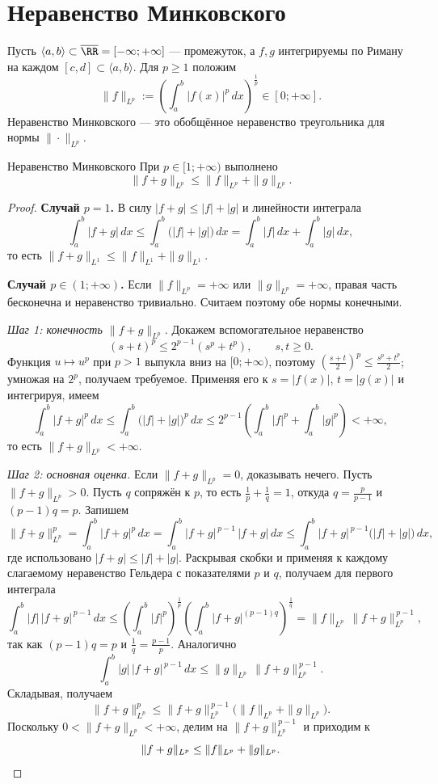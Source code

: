 
\section{Неравенство Минковского}

Пусть $\langle a,b\rangle\subset\overline{\RR}=[-\infty;+\infty]$ --- промежуток,
а $f,g$ интегрируемы по Риману на каждом $[c,d]\subset\langle a,b\rangle$. Для
$p\ge1$ положим
\[
\|f\|_{L^p}:=\left(\int_a^b |f(x)|^p\,dx\right)^{\frac1p}\in[0;+\infty].
\]
Неравенство Минковского --- это обобщённое неравенство треугольника для нормы
$\|\cdot\|_{L^p}$.

\begin{Theorem}{Неравенство Минковского}{}
	При $p\in[1;+\infty)$ выполнено
	\[
	\|f+g\|_{L^p}\le \|f\|_{L^p}+\|g\|_{L^p}.
	\]
\end{Theorem}

\begin{proof}
	\textbf{Случай $p=1$.} В силу $|f+g|\le|f|+|g|$ и линейности интеграла
	\[
	\int_a^b|f+g|\,dx\le\int_a^b\bigl(|f|+|g|\bigr)\,dx=\int_a^b|f|\,dx+\int_a^b|g|\,dx,
	\]
	то есть $\|f+g\|_{L^1}\le\|f\|_{L^1}+\|g\|_{L^1}$.

	\medskip
	\textbf{Случай $p\in(1;+\infty)$.} Если $\|f\|_{L^p}=+\infty$ или
	$\|g\|_{L^p}=+\infty$, правая часть бесконечна и неравенство тривиально.
	Считаем поэтому обе нормы конечными.

	\emph{Шаг 1: конечность $\|f+g\|_{L^p}$.} Докажем вспомогательное неравенство
	\[
	(s+t)^p\le 2^{p-1}(s^p+t^p),\qquad s,t\ge0.
	\]
	Функция $u\mapsto u^p$ при $p>1$ выпукла вниз на $[0;+\infty)$, поэтому
	$\left(\frac{s+t}{2}\right)^p\le\frac{s^p+t^p}{2}$; умножая на $2^p$, получаем
	требуемое. Применяя его к $s=|f(x)|$, $t=|g(x)|$ и интегрируя, имеем
	\[
	\int_a^b|f+g|^p\,dx\le\int_a^b\bigl(|f|+|g|\bigr)^p\,dx
	\le 2^{p-1}\left(\int_a^b|f|^p+\int_a^b|g|^p\right)<+\infty,
	\]
	то есть $\|f+g\|_{L^p}<+\infty$.

	\emph{Шаг 2: основная оценка.} Если $\|f+g\|_{L^p}=0$, доказывать нечего.
	Пусть $\|f+g\|_{L^p}>0$. Пусть $q$ сопряжён к $p$, то есть
	$\frac1p+\frac1q=1$, откуда $q=\frac{p}{p-1}$ и $(p-1)q=p$. Запишем
	\[
	\|f+g\|_{L^p}^p=\int_a^b|f+g|^p\,dx=\int_a^b|f+g|^{\,p-1}\,|f+g|\,dx
	\le\int_a^b|f+g|^{\,p-1}\bigl(|f|+|g|\bigr)\,dx,
	\]
	где использовано $|f+g|\le|f|+|g|$. Раскрывая скобки и применяя к каждому
	слагаемому неравенство Гельдера с показателями $p$ и $q$, получаем для
	первого интеграла
	\[
	\int_a^b|f|\,|f+g|^{\,p-1}\,dx
	\le\left(\int_a^b|f|^p\right)^{\frac1p}
	\left(\int_a^b|f+g|^{(p-1)q}\right)^{\frac1q}
	=\|f\|_{L^p}\,\|f+g\|_{L^p}^{\,p-1},
	\]
	так как $(p-1)q=p$ и $\frac1q=\frac{p-1}{p}$. Аналогично
	\[
	\int_a^b|g|\,|f+g|^{\,p-1}\,dx\le\|g\|_{L^p}\,\|f+g\|_{L^p}^{\,p-1}.
	\]
	Складывая, получаем
	\[
	\|f+g\|_{L^p}^p\le \|f+g\|_{L^p}^{\,p-1}\bigl(\|f\|_{L^p}+\|g\|_{L^p}\bigr).
	\]
	Поскольку $0<\|f+g\|_{L^p}<+\infty$, делим на $\|f+g\|_{L^p}^{\,p-1}$ и
	приходим к
	\[
	\|f+g\|_{L^p}\le \|f\|_{L^p}+\|g\|_{L^p}. \qedhere
	\]
\end{proof}

